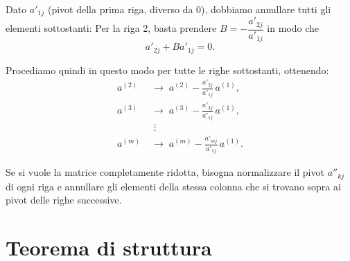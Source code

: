 {\begin{itemize}
    Dato \(a'_{1j}\) (pivot della prima riga, diverso da 0), dobbiamo annullare tutti gli elementi sottostanti:  
    Per la riga 2, basta prendere \(B = -\dfrac{a'_{2j}}{a'_{1j}}\) in modo che
    \[
        a'_{2j} + B a'_{1j} = 0.
    \]

    Procediamo quindi in questo modo per tutte le righe sottostanti, ottenendo:
    \[
    \begin{aligned}
        a^{(2)} &\;\to\; a^{(2)} - \frac{a'_{2j}}{a'_{1j}}\, a^{(1)}, \\
        a^{(3)} &\;\to\; a^{(3)} - \frac{a'_{3j}}{a'_{1j}}\, a^{(1)}, \\
        &\;\;\vdots \\
        a^{(m)} &\;\to\; a^{(m)} - \frac{a'_{mj}}{a'_{1j}}\, a^{(1)}.
    \end{aligned}
    \]

    Se si vuole la matrice completamente ridotta, bisogna normalizzare il pivot \(a''_{kj}\) di ogni riga e annullare gli elementi della
    stessa colonna che si trovano sopra ai pivot delle righe successive. 
\end{itemize}
}


\section{Teorema di struttura}

